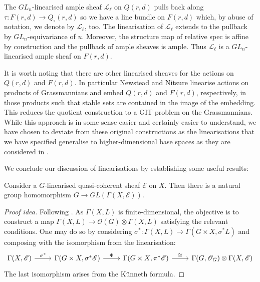 \documentclass[12pt]{ociamthesis}  %
\begin{document}
\begin{example}
  The $GL_n$-linearised ample sheaf $\mathscr L_\ell$ on
  $Q(r,d)$ pulls back along $\tau:F(r,d)\to Q_\circ(r,d)$ so
  we have a line bundle on $F(r,d)$ which, by abuse of
  notation, we denote by $\mathscr L_\ell$, too. The
  linearisation of $\mathscr L_\ell$ extends to the pullback by
  $GL_n$-equivariance of $u$. Moreover, the structure
  map of relative spec is affine by construction and the
  pullback of ample sheaves is ample. Thus $\mathscr L_\ell$
  is a $GL_n$-linearised ample sheaf on $F(r,d)$.
\end{example}

It is worth noting that there are other linearised sheaves for
the actions on $Q(r,d)$ and $F(r,d)$.  In particular
Newstead \cite{newstead1978} and Nitsure \cite{nitsure1991} linearise
actions on products of Grassmannians and embed $Q(r,d)$ and $F(r,d)$,
respectively, in those products such that stable sets are contained
in the image of the embedding. This reduces the quotient construction
to a GIT problem on the Grassmannians. While this approach is in
some sense easier and certainly easier to understand, we have
chosen to deviate from these original constructions as the linearisations
that we have specified generalise to higher-dimensional base spaces
as they are considered in \cite{huybrechts2010}.

We conclude our discussion of linearisations by establishing
some useful results:

\begin{lemma}\label{lem:linearisations_give_reps}
  Consider a $G$-linearised quasi-coherent sheaf $\mathscr E$ on $X$.
  Then there is a natural group homomorphism $G\to GL(\Gamma(X,\mathscr E))$.
  \begin{proof}[Proof idea]
    Following \cite[Lemma 5.19]{hoskins2016}. As $\Gamma(X,L)$
    is finite-dimensional, the objective is to construct a map
    $\Gamma(X,L) \to \mathscr O(G) \otimes \Gamma(X,L)$
    satisfying the relevant conditions. One may do so by considering
    $\sigma^* : \Gamma(X,L) \to \Gamma(G\times X,\sigma^*L)$ and
    composing with the isomorphism from the linearisation:
    \begin{equation*}
      \begin{tikzcd}
        {\Gamma(X,\mathscr E)} & {\Gamma(G\times X,\sigma^*\mathscr E)} & {\Gamma(G\times X,\pi^*\mathscr E)} & {\Gamma(G,\mathscr O_G)\otimes\Gamma(X,\mathscr E)}
        \arrow["{\sigma^*}", from=1-1, to=1-2]
        \arrow["\Phi", from=1-2, to=1-3]
        \arrow["\cong", from=1-3, to=1-4]
      \end{tikzcd}
    \end{equation*}
    The last isomorphism arises from the K\"unneth formula.
  \end{proof}
\end{lemma}
\end{document}
